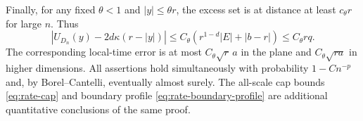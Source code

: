 Finally, for any fixed $\theta<1$ and $|y|\le\theta r$, the excess set
is at distance at least $c_\theta r$ for large $n$. Thus
\begin{equation}\label{eq:rate-bulk-potential}
 |U_{D_n}(y)-2d\kappa(r-|y|)|
 \le C_\theta(r^{1-d}|E|+|b-r|)\le C_\theta rq.
\end{equation}
The corresponding local-time error is at most $C_\theta\sqrt r\,a$
in the plane and $C_\theta\sqrt{ra}$ in higher dimensions.
All assertions hold simultaneously with probability $1-Cn^{-p}$ and,
by Borel--Cantelli, eventually almost surely. The all-scale cap bounds
\eqref{eq:rate-cap} and boundary profile \eqref{eq:rate-boundary-profile}
are additional quantitative conclusions of the same proof.
